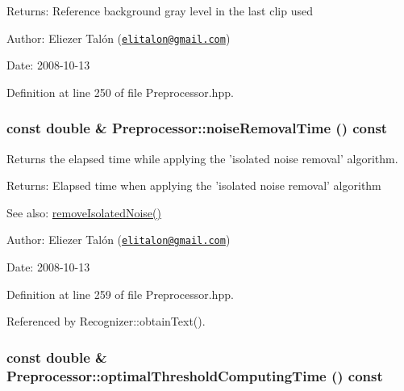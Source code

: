 \begin{Desc}
\item[Returns:]Reference background gray level in the last clip used\end{Desc}
\begin{Desc}
\item[Author:]Eliezer Talón (\href{mailto:elitalon@gmail.com}{\tt elitalon@gmail.com}) \end{Desc}
\begin{Desc}
\item[Date:]2008-10-13 \end{Desc}


Definition at line 250 of file Preprocessor.hpp.\hypertarget{class_preprocessor_e54e2a5703a0f39ddff8e9936f9a2275}{
\subsubsection[noiseRemovalTime]{\setlength{\rightskip}{0pt plus 5cm}const double \& Preprocessor::noiseRemovalTime () const}}
\label{class_preprocessor_e54e2a5703a0f39ddff8e9936f9a2275}


Returns the elapsed time while applying the 'isolated noise removal' algorithm. 

\begin{Desc}
\item[Returns:]Elapsed time when applying the 'isolated noise removal' algorithm\end{Desc}
\begin{Desc}
\item[See also:]\hyperlink{class_preprocessor_a3e047486a0a80f2103f51d7141e41c5}{removeIsolatedNoise()}\end{Desc}
\begin{Desc}
\item[Author:]Eliezer Talón (\href{mailto:elitalon@gmail.com}{\tt elitalon@gmail.com}) \end{Desc}
\begin{Desc}
\item[Date:]2008-10-13 \end{Desc}


Definition at line 259 of file Preprocessor.hpp.

Referenced by Recognizer::obtainText().\hypertarget{class_preprocessor_2bd63a7e7aba300ddf79b2c956e943e9}{
\subsubsection[optimalThresholdComputingTime]{\setlength{\rightskip}{0pt plus 5cm}const double \& Preprocessor::optimalThresholdComputingTime () const}}
\label{class_preprocessor_2bd63a7e7aba300ddf79b2c956e943e9}


